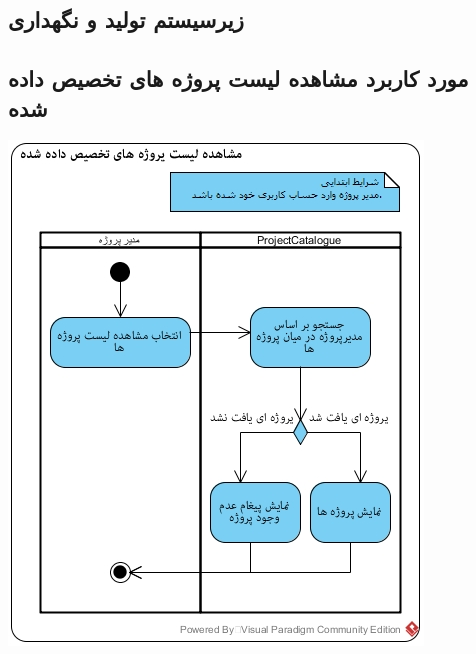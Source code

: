 \newpage
\subsection{زیرسیستم تولید و نگهداری}

\vspace{2cm}
\subsection*{مورد کاربرد مشاهده لیست پروژه های تخصیص داده شده}
\vspace{2cm}
\begin{center}
\includegraphics[width=\textwidth]{ActivityDiagramsWithSwimlanes/16.jpg}
\end{center}


\newpage
\vspace{2cm}
